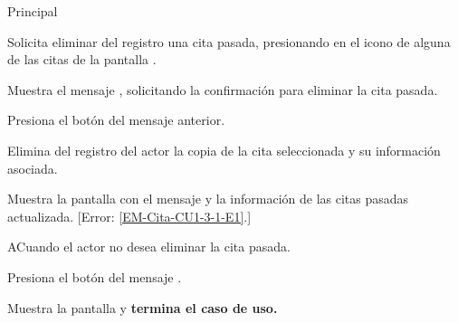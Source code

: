 \begin{UCtrayectoria}{Principal}

	\UCpaso [\UCactor] Solicita eliminar del registro una cita pasada, presionando en el icono  de alguna de las citas de la pantalla .

	\UCpaso Muestra el mensaje , solicitando la confirmación para eliminar la cita pasada. 

	\UCpaso Presiona el botón  del mensaje anterior.  
 
	\UCpaso Elimina del registro del actor la copia de la cita seleccionada y su información asociada. 

	\UCpaso Muestra la pantalla  con el mensaje  y la información de las citas pasadas actualizada. [Error: \ref{EM-Cita-CU1-3-1-E1}.]
	

\end{UCtrayectoria}

\begin{UCtrayectoriaA}{A}{Cuando el actor no desea eliminar la cita pasada.}

	\UCpaso Presiona el botón  del mensaje .

	\UCpaso Muestra la pantalla  y \textbf{termina el caso de uso.}

\end{UCtrayectoriaA}